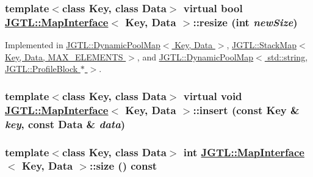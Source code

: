 \hypertarget{class_j_g_t_l_1_1_map_interface_177b75de36104c54e53080db65b777a2}{
\subsubsection[resize]{\setlength{\rightskip}{0pt plus 5cm}template$<$class Key, class Data$>$ virtual bool \hyperlink{class_j_g_t_l_1_1_map_interface}{JGTL::Map\-Interface}$<$ Key, Data $>$::resize (int {\em new\-Size})}}
\label{class_j_g_t_l_1_1_map_interface_177b75de36104c54e53080db65b777a2}




Implemented in \hyperlink{class_j_g_t_l_1_1_dynamic_pool_map_236509cad797d15cbed5e09adf356a04}{JGTL::Dynamic\-Pool\-Map$<$ Key, Data $>$}, \hyperlink{class_j_g_t_l_1_1_stack_map_cd9363efffeb00f6b48b21ed2685ac7c}{JGTL::Stack\-Map$<$ Key, Data, MAX\_\-ELEMENTS $>$}, and \hyperlink{class_j_g_t_l_1_1_dynamic_pool_map_236509cad797d15cbed5e09adf356a04}{JGTL::Dynamic\-Pool\-Map$<$ std::string, JGTL::Profile\-Block $\ast$ $>$}.\hypertarget{class_j_g_t_l_1_1_map_interface_e416f8f15a065ea183c289932ef794c6}{
\subsubsection[insert]{\setlength{\rightskip}{0pt plus 5cm}template$<$class Key, class Data$>$ virtual void \hyperlink{class_j_g_t_l_1_1_map_interface}{JGTL::Map\-Interface}$<$ Key, Data $>$::insert (const Key \& {\em key}, const Data \& {\em data})}}
\label{class_j_g_t_l_1_1_map_interface_e416f8f15a065ea183c289932ef794c6}


\hypertarget{class_j_g_t_l_1_1_map_interface_416044d92d5c6d09ed79d13a775ba222}{
\subsubsection[size]{\setlength{\rightskip}{0pt plus 5cm}template$<$class Key, class Data$>$ int \hyperlink{class_j_g_t_l_1_1_map_interface}{JGTL::Map\-Interface}$<$ Key, Data $>$::size () const}}
\label{class_j_g_t_l_1_1_map_interface_416044d92d5c6d09ed79d13a775ba222}


